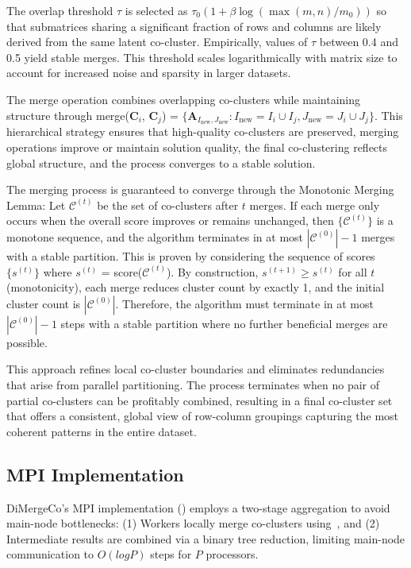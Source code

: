 \documentclass[journal]{IEEEtran}
\begin{document}
The overlap threshold $\tau$ is selected as $\tau_0(1 + \beta\log(\max(m,n)/m_0))$ so that submatrices sharing a significant fraction of rows and columns are likely derived from the same latent co-cluster. Empirically, values of $\tau$ between 0.4 and 0.5 yield stable merges. This threshold scales logarithmically with matrix size to account for increased noise and sparsity in larger datasets.

The merge operation combines overlapping co-clusters while maintaining structure through merge($\mathbf{C}_i$, $\mathbf{C}_j$) = $\{\mathbf{A}_{I_{\text{new}}, J_{\text{new}}} : I_{\text{new}} = I_i \cup I_j, J_{\text{new}} = J_i \cup J_j\}$. This hierarchical strategy ensures that high-quality co-clusters are preserved, merging operations improve or maintain solution quality, the final co-clustering reflects global structure, and the process converges to a stable solution.

The merging process is guaranteed to converge through the Monotonic Merging Lemma: Let $\mathcal{C}^{(t)}$ be the set of co-clusters after $t$ merges. If each merge only occurs when the overall score improves or remains unchanged, then $\{\mathcal{C}^{(t)}\}$ is a monotone sequence, and the algorithm terminates in at most $|\mathcal{C}^{(0)}|-1$ merges with a stable partition. This is proven by considering the sequence of scores $\{s^{(t)}\}$ where $s^{(t)}$ = score($\mathcal{C}^{(t)}$). By construction, $s^{(t+1)} \geq s^{(t)}$ for all $t$ (monotonicity), each merge reduces cluster count by exactly 1, and the initial cluster count is $|\mathcal{C}^{(0)}|$. Therefore, the algorithm must terminate in at most $|\mathcal{C}^{(0)}|-1$ steps with a stable partition where no further beneficial merges are possible.

This approach refines local co-cluster boundaries and eliminates redundancies that arise from parallel partitioning. The process terminates when no pair of partial co-clusters can be profitably combined, resulting in a final co-cluster set that offers a consistent, global view of row-column groupings capturing the most coherent patterns in the entire dataset.

\subsection{MPI Implementation}
\label{subsec:mpi_implementation}
DiMergeCo's MPI implementation () employs a two-stage aggregation to avoid main-node bottlenecks: (1) Workers locally merge co-clusters using~, and (2) Intermediate results are combined via a binary tree reduction, limiting main-node communication to $O(log P)$ steps for $P$ processors.
\end{document}
